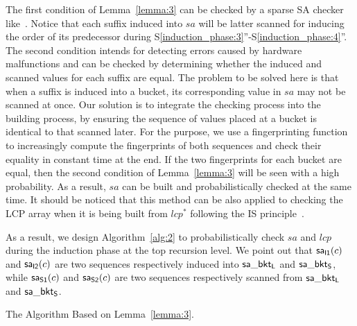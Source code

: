 \documentclass[10pt,journal,compsoc]{IEEEtran}
\begin{document}
The first condition of Lemma~\ref{lemma:3} can be checked by a sparse SA checker like~\cite{wu2017}. Notice that each suffix induced into $sa$ will be latter scanned for inducing the order of its predecessor during S\ref{induction_phase:3}''-S\ref{induction_phase:4}''. The second condition intends for detecting errors caused by hardware malfunctions and can be checked by determining whether the induced and scanned values for each suffix are equal. The problem to be solved here is that when a suffix is induced into a bucket, its corresponding value in $sa$ may not be scanned at once. Our solution is to integrate the checking process into the building process, by ensuring the sequence of values placed at a bucket is identical to that scanned later. For the purpose, we use a fingerprinting function to increasingly compute the fingerprints of both sequences and check their equality in constant time at the end. If the two fingerprints for each bucket are equal, then the second condition of Lemma~\ref{lemma:3} will be seen with a high probability. As a result, $sa$ can be built and probabilistically checked at the same time. It should be noticed that this method can be also applied to checking the LCP array when it is being built from $lcp^*$ following the IS principle~\cite{Fischer11}. 

As a result, we design Algorithm~\ref{alg:2} to probabilistically check $sa$ and $lcp$ during the induction phase at the top recursion level. We point out that ${\sf sa_{I1}}(c)$ and ${\sf sa_{I2}}(c)$ are two sequences respectively induced into ${\sf sa\_bkt_L}$ and ${\sf sa\_bkt_S}$, while ${\sf sa_{S1}}(c)$ and ${\sf sa_{S2}}(c)$ are two sequences respectively scanned from ${\sf sa\_bkt_L}$ and ${\sf sa\_bkt_S}$.



\begin{algorithm*}

	\caption{The Algorithm Based on Lemma~\ref{lemma:3}.}
	
	\label{alg:2}
	
	\end{algorithm*}
\end{document}
